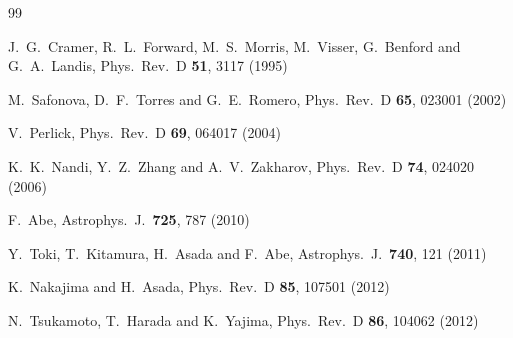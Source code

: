 \documentclass[twocolumn,showpacs,preprintnumbers,amsmath,amssymb,floatfix]{revtex4-1}
\begin{document}






\begin{thebibliography}{99}

  J.~G.~Cramer, R.~L.~Forward, M.~S.~Morris, M.~Visser, G.~Benford and G.~A.~Landis,
  Phys.\ Rev.\ D {\bf 51}, 3117 (1995)

  M.~Safonova, D.~F.~Torres and G.~E.~Romero,
  Phys.\ Rev.\ D {\bf 65}, 023001 (2002)

  V.~Perlick,
  Phys.\ Rev.\ D {\bf 69}, 064017 (2004)

  K.~K.~Nandi, Y.~Z.~Zhang and A.~V.~Zakharov,
  Phys.\ Rev.\ D {\bf 74}, 024020 (2006)

  F.~Abe,
  Astrophys.\ J.\  {\bf 725}, 787 (2010)

  Y.~Toki, T.~Kitamura, H.~Asada and F.~Abe,
  Astrophys.\ J.\  {\bf 740}, 121 (2011)

  K.~Nakajima and H.~Asada,
  Phys.\ Rev.\ D {\bf 85}, 107501 (2012)

  N.~Tsukamoto, T.~Harada and K.~Yajima,
  Phys.\ Rev.\ D {\bf 86}, 104062 (2012)


\end{thebibliography}
\end{document}
